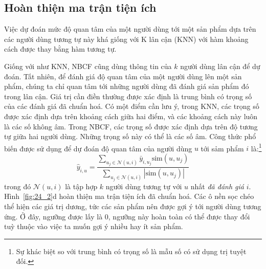 


\subsection{Hoàn thiện ma trận tiện ích}

Việc {dự đoán mức độ quan tâm} của một
người dùng tới một sản phẩm dựa trên các người dùng tương tự này khá giống với
{K lân cận} (KNN) với hàm khoảng cách được thay bằng hàm tương tự.

Giống với như KNN, NBCF cũng dùng thông tin của $k$ người dùng lân cận để dự
đoán. Tất nhiên, để đánh giá độ quan tâm của một người dùng lên một
sản phẩm, chúng ta chỉ quan tâm tới những người dùng
đã đánh giá sản phẩm đó trong lân cận. {Giá trị cần điền} thường được xác
định là {trung bình có trọng số} của các đánh giá đã chuẩn hoá. Có một điểm cần lưu ý, trong KNN, các trọng số được xác định dựa trên
khoảng cách giữa hai điểm, và các khoảng cách này luôn là các số không âm.
Trong NBCF, các trọng số được xác định dựa trên độ tương tự giữa hai
người dùng. Những trọng số này có thể là các số âm. Công thức phổ biến được sử
dụng để dự đoán độ quan tâm của người dùng $u$ tới sảm phẩm $i$
là:\footnote{Sự khác biệt so với trung bình có trọng số là mẫu số có sử dụng trị
tuyệt đối.}
\begin{equation}
\hat{y}_{i, u} = \frac{\sum_{u_j \in \mathcal{N}(u, i)} \bar{y}_{i, u_j} \text{sim}(u, u_j)}{\sum_{u_j \in \mathcal{N}(u, i)} |\text{sim}(u, u_j)|}
\end{equation}
trong đó $\mathcal{N}(u, i)$ là tập hợp $k$ người dùng tương tự với $u$ nhất \textit{đã đánh giá} $i$.
Hình~\ref{fig:24_2}d hoàn thiện
ma trận tiện ích đã chuẩn hoá. Các ô
nền sọc chéo thể hiện các giá trị dương, tức các sản phẩm nên được gợi ý tới người dùng tương ứng. Ở đây, ngưỡng được lấy là 0, ngưỡng này
hoàn toàn có thể được thay đổi tuỳ thuộc vào việc ta muốn gợi ý nhiều hay ít
sản phẩm.

